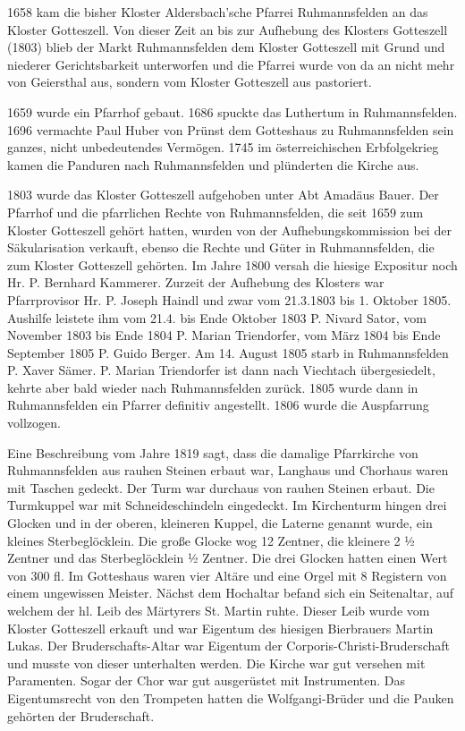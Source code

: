 \documentclass[12pt,a4paper]{book}
\begin{document}
1658 kam die bisher Kloster Aldersbach'sche Pfarrei Ruhmannsfelden an das
Kloster Gotteszell. Von dieser Zeit an bis zur Aufhebung des Klosters Gotteszell
(1803) blieb der Markt Ruhmannsfelden dem Kloster Gotteszell mit Grund und
niederer Gerichtsbarkeit unterworfen und die Pfarrei wurde von da an nicht mehr
von Geiersthal aus, sondern vom Kloster Gotteszell aus pastoriert.

1659 wurde ein Pfarrhof gebaut. 1686 spuckte das Luthertum in Ruhmannsfelden.
1696 vermachte Paul Huber von Prünst dem Gotteshaus zu Ruhmannsfelden sein
ganzes, nicht unbedeutendes Vermögen. 1745 im österreichischen Erbfolgekrieg
kamen die Panduren nach Ruhmannsfelden und plünderten die Kirche aus.

1803 wurde das Kloster Gotteszell aufgehoben unter Abt Amadäus Bauer. Der
Pfarrhof und die pfarrlichen Rechte von Ruhmannsfelden, die seit 1659 zum
Kloster Gotteszell gehört hatten, wurden von der Aufhebungskommission bei der
Säkularisation verkauft, ebenso die Rechte und Güter in Ruhmannsfelden, die zum
Kloster Gotteszell gehörten. Im Jahre 1800 versah die hiesige Expositur noch Hr.
P. Bernhard Kammerer. Zurzeit der Aufhebung des Klosters war Pfarrprovisor Hr.
P. Joseph Haindl und zwar vom 21.3.1803 bis 1. Oktober 1805. Aushilfe leistete
ihm vom 21.4. bis Ende Oktober 1803 P. Nivard Sator, vom November 1803 bis Ende
1804 P. Marian Triendorfer, vom März 1804 bis Ende September 1805 P. Guido
Berger. Am 14. August 1805 starb in Ruhmannsfelden P. Xaver Sämer. P. Marian
Triendorfer ist dann nach Viechtach übergesiedelt, kehrte aber bald wieder nach
Ruhmannsfelden zurück. 1805 wurde dann in Ruhmannsfelden ein Pfarrer definitiv
angestellt. 1806 wurde die Auspfarrung vollzogen.

Eine Beschreibung vom Jahre 1819 sagt, dass die damalige Pfarrkirche von
Ruhmannsfelden aus rauhen Steinen erbaut war, Langhaus und Chorhaus waren mit
Taschen gedeckt. Der Turm war durchaus von rauhen Steinen erbaut. Die Turmkuppel
war mit Schneideschindeln eingedeckt. Im Kirchenturm hingen drei Glocken und in
der oberen, kleineren Kuppel, die Laterne genannt wurde, ein kleines
Sterbeglöcklein. Die große Glocke wog 12 Zentner, die kleinere 2 ½  Zentner und
das Sterbeglöcklein ½  Zentner. Die drei Glocken hatten einen Wert von 300 fl.
Im Gotteshaus waren vier Altäre und eine Orgel mit 8 Registern von einem
ungewissen Meister. Nächst dem Hochaltar befand sich ein Seitenaltar, auf
welchem der hl. Leib des Märtyrers St. Martin ruhte. Dieser Leib wurde vom
Kloster Gotteszell erkauft und war Eigentum des hiesigen Bierbrauers Martin
Lukas. Der Bruderschafts-Altar war Eigentum der Corporis-Christi-Bruderschaft
und musste von dieser unterhalten werden. Die Kirche war gut versehen mit
Paramenten. Sogar der Chor war gut ausgerüstet mit Instrumenten. Das
Eigentumsrecht von den Trompeten hatten die Wolfgangi-Brüder und die Pauken
gehörten der Bruderschaft.
\end{document}
